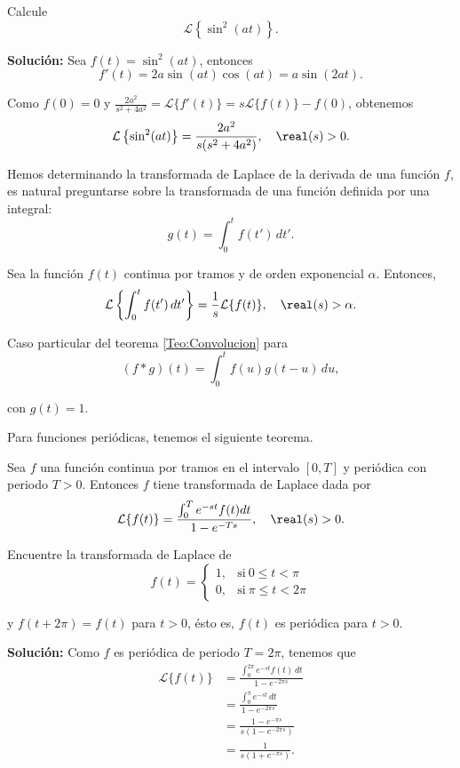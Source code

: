 \begin{ejemplo}
Calcule 
$$\mathcal{L}\left\{\sin^2(at)\right\}.$$   

\textbf{Solución:} Sea $f(t) = \sin^2(at)$, entonces
$$f'(t) = 2a \sin(at) \cos(at) = a \sin(2at).$$

Como $f(0) = 0$ y $\frac{2a^2}{s^2+4a^2} = \mathcal{L}\{f'(t)\} = s \mathcal{L}\{f(t)\} - f(0)$, obtenemos
$$\mathcal{L}\left\{\sin^2(at)\right\} = \frac{2a^2}{s(s^2+4a^2)}, \quad \real(s) > 0.$$
\end{ejemplo}

Hemos determinando la transformada de Laplace de la derivada de una función $f$, es natural preguntarse sobre la transformada de una función definida por una integral:
$$g(t) = \int_0^t f(t') \,dt'.$$

\begin{teorema}
     Sea la función $f(t)$ continua por tramos y de orden exponencial $\alpha$. Entonces,
     $$\mathcal{L} \left\{ \int_0^t f(t') \,dt'\right\} = \frac{1}{s} \mathcal{L}\{f(t)\}, \quad \real(s) > \alpha.$$
\end{teorema}

\begin{demo}
Caso particular del teorema \ref{Teo:Convolucion} para 
$$(f * g)(t) = \int_0^t f(u) g(t-u) \,du,$$

con $g(t) = 1$.
\end{demo}

Para funciones periódicas, tenemos el siguiente teorema.

\begin{teorema}
 Sea $f$ una función continua por tramos en el intervalo $[0,T]$ y periódica con periodo $T>0$. Entonces $f$ tiene transformada de Laplace dada por
\begin{equation*}
\mathcal{L}\{f(t)\} = \frac{\int_0^T e^{-st} f(t) dt}{1-e^{-Ts}}, \quad \real(s) > 0.
\end{equation*}
   
\end{teorema}

\begin{ejemplo}
    Encuentre la transformada de Laplace de
    $$f(t) = \left\{ \begin{array}{cl}
     1,& \text{si} ~ 0 \leq t < \pi  \\
     0,& \text{si} ~ \pi \leq t < 2\pi
    \end{array} \right.$$

    y $f(t+ 2\pi) = f(t)$ para $t > 0$, ésto es, $f(t)$ es periódica para $t > 0$.

    \textbf{Solución:} Como $f$ es periódica de periodo $T = 2\pi$, tenemos que
    \begin{align*}
        \mathcal{L}\{f(t)\} &= \frac{\int_0^{2\pi} e^{-st} f(t) \,dt}{1-e^{-2\pi s}} \\
        &= \frac{\int_0^{\pi} e^{-st}\,dt}{1-e^{-2\pi s}} \\
        &= \frac{1-e^{-\pi s}}{s(1-e^{-2\pi s})} \\
        &= \frac{1}{s(1+e^{-\pi s})}.
    \end{align*}
\end{ejemplo}

